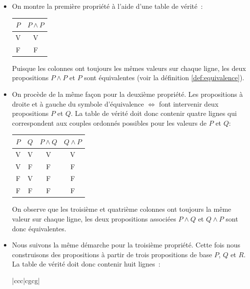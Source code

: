 \documentclass[10pt,notheorems]{beamer}
\theoremstyle{plain}
\theoremstyle{definition} %
\begin{document}
  \begin{notes}
    \begin{itemize}
    \item On montre la première propriété à l'aide d'une table de
      vérité :
      \begin{table}
        \centering
        \begin{tabular}[H]{|c|c|}
          \hline
          $P$ & $P \land P$ \\ \hline
          V & V \\
          F & F \\
          \hline\hline
        \end{tabular}
      \end{table}
      Puisque les colonnes ont toujours les mêmes valeurs sur chaque
      ligne, les deux propositions $P\land P$ et $P$ sont équivalentes
      (voir la définition \autoref{def:equivalence}).
    \item On procède de la même façon pour la deuxième propriété. Les
      propositions à droite et à gauche du symbole d'équivalence
      $\Leftrightarrow$ font intervenir deux propositions $P$ et
      $Q$. La table de vérité doit donc contenir quatre lignes qui
      correspondent aux couples ordonnés possibles pour les
      valeurs de $P$ et $Q$:
      \begin{table}[H]
        \centering
        \begin{tabular}[H]{|cc|cc|}
          \hline
          $P$ & $Q$ & $P \land Q$ & $Q \land P$\\ \hline
          V & V & V & V\\
          V & F & F & F\\
          F & V & F & F\\
          F & F & F & F \\
          \hline\hline
        \end{tabular}
      \end{table}
      On observe que les troisième et quatrième colonnes ont toujours
      la même valeur sur chaque ligne, les deux propositions associées
      $P \land Q$ et $Q \land P$ sont donc
      équivalentes.
    \item Nous suivons la même démarche pour la troisième
      propriété. Cette fois nous construisons des propositions à
      partir de trois propositions de base $P$, $Q$ et $R$. La table
      de vérité doit donc contenir huit lignes :
      \begin{table}[H]
        \centering
        \begin{tabular}[H]{|ccc|cgcg|}

\end{tabular}
\end{table}
\end{itemize}
\end{notes}
\end{document}
